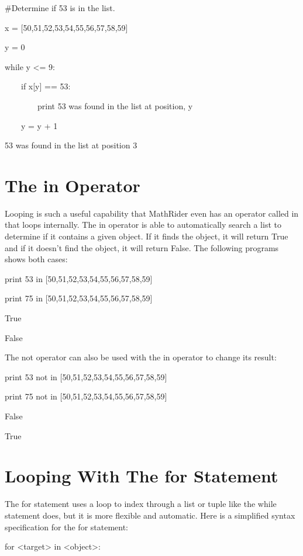 \documentclass[12pt,oneside]{book}
\begin{document}
\#Determine if 53 is in the list.

x = [50,51,52,53,54,55,56,57,58,59]

y = 0

while y {\textless}= 9:

\ \ \ \ if x[y] == 53:

\ \ \ \ \ \ \ \ print {\textquotedbl}53 was found in the list at position{\textquotedbl}, y

\ \ \ \ y = y + 1

{\textbar}

53 was found in the list at position 3

\section[The in Operator]{The in Operator}

Looping is such a useful capability that MathRider even has an operator called in that loops internally. The in operator is able to automatically search a list to determine if it contains a given object. If it finds the object, it will return True and if it doesn't find the object, it will return False. The following programs shows both cases: 


print 53 in [50,51,52,53,54,55,56,57,58,59]

print 75 in [50,51,52,53,54,55,56,57,58,59]

{\textbar}

True

False


The not operator can also be used with the in operator to change its result:


print 53 not in [50,51,52,53,54,55,56,57,58,59]

print 75 not in [50,51,52,53,54,55,56,57,58,59]

{\textbar}

False

True

\section[Looping With The for Statement]{Looping With The for Statement}

The for statement uses a loop to index through a list or tuple like the while statement does, but it is more flexible and automatic. Here is a simplified syntax specification for the for statement: 

for {\textless}target{\textgreater} in {\textless}object{\textgreater}:
\end{document}
